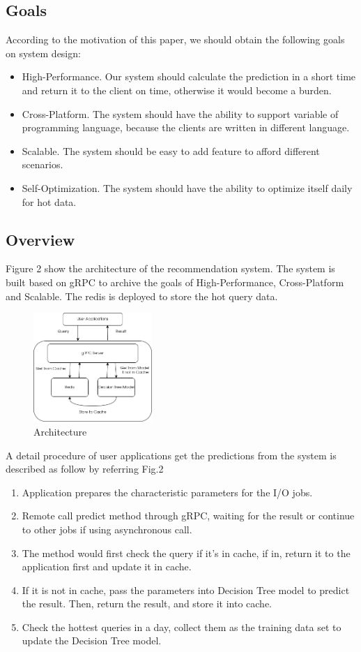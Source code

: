 \documentclass[conference]{IEEEtran}
\begin{document}
\subsection{Goals}
According to the motivation of this paper, we should obtain the following goals
on system design:
\begin{itemize}
	\item High-Performance. Our system should calculate the prediction in a short time and return it to the client on time, otherwise it would become a burden.
	\item Cross-Platform. The system should have the ability to support variable of programming language, because the clients are written in different language.
	\item Scalable. The system should be easy to add feature to afford different scenarios.
	\item Self-Optimization. The system should have the ability to optimize itself daily for hot data.
\end{itemize}

\subsection{Overview}
Figure 2 show the architecture of the recommendation system. The system is built based on gRPC
to archive the goals of High-Performance, Cross-Platform and Scalable. The redis is deployed to store the hot query data.

\begin{figure}[htbp]
	\centering
	\includegraphics[width=0.4\textwidth]{architecture.png}
	\caption{Architecture}
\end{figure}

A detail procedure of user applications get the predictions from the system is described as follow by referring Fig.2
\begin{enumerate}
	\item Application prepares the characteristic parameters for the I/O jobs.
	\item Remote call predict method through gRPC, waiting for the result or continue to other jobs if using asynchronous call.
	\item The method would first check the query if it's in cache, if in, return it to the application first and update it in cache.
	\item If it is not in cache, pass the parameters into Decision Tree model to predict the result. Then, return the result, and store it into cache.
	\item Check the hottest queries in a day, collect them as the training data set to update the Decision Tree model.
\end{enumerate}
\end{document}
